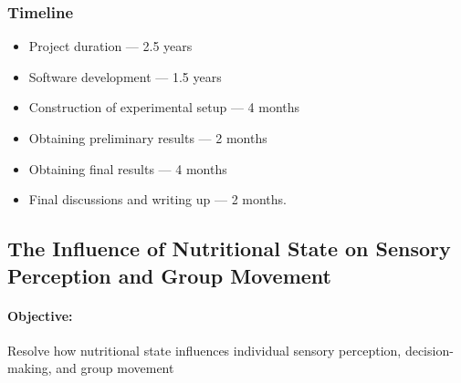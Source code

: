 \documentclass[11pt,a4paper,oneside]{article}
\begin{document}
	\subsubsection{Timeline}
	\begin{itemize}{}{}
		\item Project duration --- 2.5 years
		\item Software development --- 1.5 years
		\item Construction of experimental setup --- 4 months
		\item Obtaining preliminary results --- 2 months
		\item Obtaining final results --- 4 months	
		\item Final discussions and writing up --- 2 months.
	\end{itemize}
	

\subsection[Nutritional State and Sensory Perception]{The Influence of Nutritional State on Sensory Perception and Group Movement} \label{project2}
\paragraph{Objective:} 
Resolve how nutritional state influences individual sensory perception, decision-making, and group movement
\end{document}
